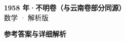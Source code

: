 \documentclass[zihao=-4, a4paper]{ctexart}
\begin{document}
\begin{center}
  {\Large\bfseries 1958 年·不明卷（与云南卷部分同源）}\\[4pt]
  {\large 数学 · 解析版}
\end{center}
\medskip
{}

\clearpage
{}
\begin{center}{\Large\bfseries 参考答案与详细解析}\end{center}
\medskip

\end{document}
